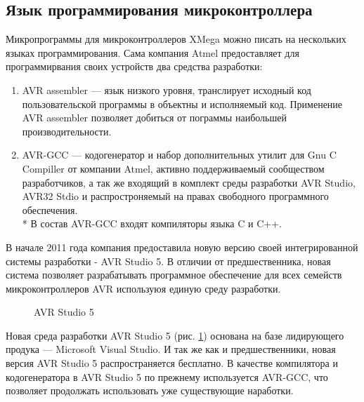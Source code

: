 \subsection{Язык программирования микроконтроллера}
\begin{par}
Микропрограммы для микроконтроллеров XMega можно писать на нескольких языках программирования.
Сама компания Atmel предоставляет для программирвания своих устройств два средства разработки:
	\begin{enumerate}
		\item{}AVR assembler --- язык низкого уровня, транслирует исходный код пользовательской
                программы в объектны и исполняемый код. Применение AVR assembler позволяет
                добиться от пограммы наибольшей производительности.
		\item{}AVR-GCC --- кодогенератор и набор дополнительных утилит для Gnu C Compiller от
                компании Atmel, активно поддерживаемый сообществом разработчиков, а так же
                входящий в комплект среды разработки AVR Studio, AVR32 Stdio и
                распростроняемый на правах свободного программного обеспечения.\\*
                В состав AVR-GCC входят компиляторы языка C и C++.
	\end{enumerate}
\end{par}

\begin{par}
В начале 2011 года компания предоставила новую версию своей интегрированной системы
разработки - AVR Studio 5. В отличии от предшественника, новая система позволяет разрабатывать
программное обеспечение для всех семейств микроконтроллеров AVR используюя единую среду разработки.
\end{par}

\begin{par}

\begin{figure}[ht]
	\caption{AVR Studio 5}
	\label{img:avr_studio}
\end{figure}


Новая среда разработки AVR Studio 5 (рис. \ref{img:avr_studio}) основана на базе лидирующего продука --- Microsoft Visual Studio.
И так же как и предшественники, новая версия AVR Studio 5  распространяется бесплатно.
В качестве компилятора и кодогенератора в AVR Studio 5 по прежнему используется AVR-GCC,
что позволяет продолжать использовать уже существующие наработки.
\end{par}

